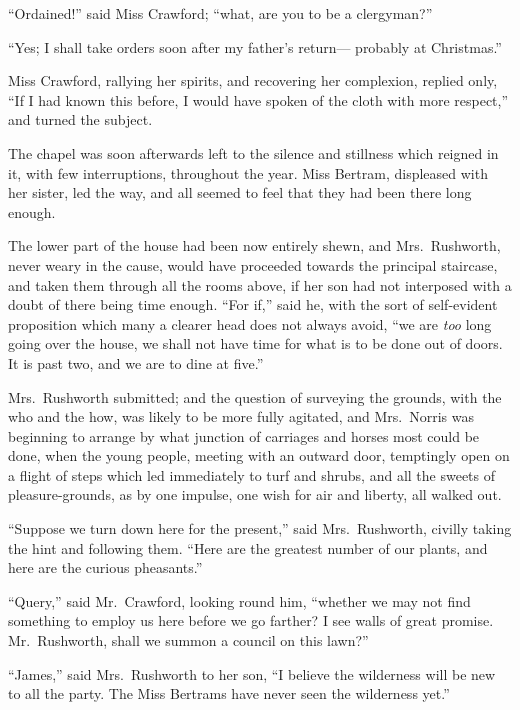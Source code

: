 ``Ordained!'' said Miss Crawford; ``what, are you to be
a clergyman?''

``Yes; I shall take orders soon after my father's return---%
probably at Christmas.''

Miss Crawford, rallying her spirits, and recovering
her complexion, replied only, ``If I had known this before,
I would have spoken of the cloth with more respect,''
and turned the subject.

The chapel was soon afterwards left to the silence and stillness
which reigned in it, with few interruptions, throughout the year.
Miss Bertram, displeased with her sister, led the way,
and all seemed to feel that they had been there long enough.

The lower part of the house had been now entirely shewn,
and Mrs.\ Rushworth, never weary in the cause, would have
proceeded towards the principal staircase, and taken
them through all the rooms above, if her son had not
interposed with a doubt of there being time enough.
``For if,'' said he, with the sort of self-evident proposition
which many a clearer head does not always avoid, ``we are
\emph{too} long going over the house, we shall not have time
for what is to be done out of doors.  It is past two,
and we are to dine at five.''

Mrs.\ Rushworth submitted; and the question of surveying
the grounds, with the who and the how, was likely to be more
fully agitated, and Mrs.\ Norris was beginning to arrange
by what junction of carriages and horses most could be done,
when the young people, meeting with an outward door,
temptingly open on a flight of steps which led immediately
to turf and shrubs, and all the sweets of pleasure-grounds,
as by one impulse, one wish for air and liberty, all walked out.

``Suppose we turn down here for the present,'' said Mrs.\ Rushworth,
civilly taking the hint and following them.  ``Here are the
greatest number of our plants, and here are the curious pheasants.''

``Query,'' said Mr.\ Crawford, looking round him,
``whether we may not find something to employ us here
before we go farther?  I see walls of great promise.
Mr.\ Rushworth, shall we summon a council on this lawn?''

``James,'' said Mrs.\ Rushworth to her son, ``I believe
the wilderness will be new to all the party.  The Miss
Bertrams have never seen the wilderness yet.''

